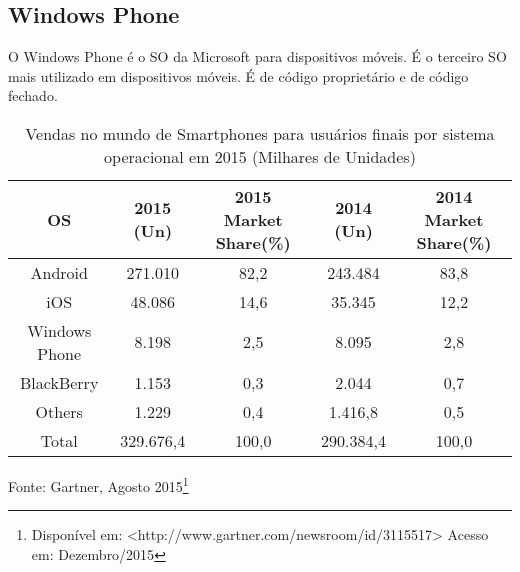 \subsection{Windows Phone}
O Windows Phone é o SO da Microsoft para dispositivos móveis. É o terceiro SO mais utilizado em dispositivos móveis. É de código proprietário e de código fechado.

\begin{table}[!htb]
	\centering
	\caption[Sistemas operacionais mais utilizados]{Vendas no mundo de Smartphones para usuários finais por sistema operacional em 2015 (Milhares de Unidades)}
	\label{tab:OS}
	\begin{tabular}{c|c|c|c|c}
		\hline \SPACE
		\textbf{OS} & \textbf{2015 (Un)}  & \textbf{2015 Market Share(\%)}  & \textbf{2014 (Un)}  & \textbf{2014 Market Share(\%)} \\ \hline \SPACE
		Android & 271.010 & 82,2 & 243.484 & 83,8\\ \hline \SPACE
		iOS & 48.086 & 14,6 & 35.345 & 12,2\\ \hline \SPACE
		Windows Phone & 8.198 & 2,5 & 8.095 & 2,8\\ \hline \SPACE
		BlackBerry & 1.153 & 0,3 & 2.044 & 0,7\\ \hline \SPACE
		Others & 1.229 & 0,4 & 1.416,8 & 0,5\\ \hline \SPACE
		Total & 329.676,4 & 100,0 & 290.384,4 & 100,0\\
		\hline
	\end{tabular}
\end{table}\vspace{-1cm}
\begin{center}\small{Fonte: Gartner, Agosto 2015\footnote[3]{Disponível em: <http://www.gartner.com/newsroom/id/3115517> Acesso em: Dezembro/2015}}
\end{center}